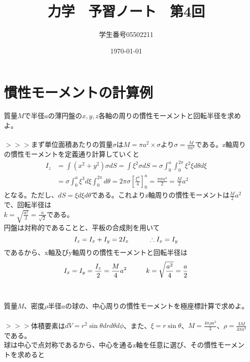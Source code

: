 \documentclass{jsarticle}
\title{力学　予習ノート　第4回}
\author{学生番号05502211}
\date{\today}
\begin{document}
\maketitle
\section{慣性モーメントの計算例}
\noindent
\(<例題1>\)\\
質量\(M\)で半径\(a\)の薄円盤の\(x,y,z\)各軸の周りの慣性モーメントと回転半径を求めよ。\\
\\
\(>>>\)まず単位面積あたりの質量\(\sigma\)は\(M=\pi a^{2}\times\sigma\)より\(\displaystyle\sigma=\frac{M}{\pi a^{2}}\)である。z軸周りの慣性モーメントを定義通り計算していくと
\begin{align*}
I_{z}&=\int(x^{2}+y^{2})\sigma dS=\int\xi^{2}\sigma dS=\sigma\int_{0}^{a}\int_{0}^{2\pi}\xi^{2}\xi d\theta d\xi\\
&=\sigma\int_{0}^{a}\xi^{3}d\xi\int_{0}^{2\pi}d\theta=2\pi\sigma\left[\frac{\xi^{4}}{4}\right]_{0}^{a}=\frac{\pi\sigma a^{4}}{2}=\frac{M}{2}a^{2}
\end{align*}
となる。ただし、\(dS=\xi d\xi d\theta\)である。これよりz軸周りの慣性モーメントは\(\displaystyle\frac{M}{2}a^{2}\)で、回転半径は\\
\(\displaystyle k=\sqrt{\frac{a^{2}}{2}}=\frac{a}{\sqrt{2}}\)である。\\
円盤は対称的であることと、平板の合成則を用いて
\[I_{z}=I_{x}+I_{y}=2I_{x}\hspace{10mm}\therefore I_{x}=I_{y}\]
であるから、x軸及びy軸周りの慣性モーメントと回転半径は
\[I_{x}=I_{y}=\frac{I_{z}}{2}=\frac{M}{4}a^{2}\hspace{10mm}k=\sqrt{\frac{a^{2}}{4}}=\frac{a}{2}\]
\\
\\
\(<例題2>\)\\
質量\(M\)、密度\(\rho\)半径\(a\)の球の、中心周りの慣性モーメントを極座標計算で求めよ。\\
\\
\(>>>\)体積要素は\(dV=r^{2}\sin\theta drd\theta d\phi\)、また、\(\xi=r\sin\theta\)、\(\displaystyle M=\frac{4\pi\rho a^{3}}{3}\)、\(\displaystyle\rho=\frac{3M}{4\pi a^{3}}\)である。\\
球は中心で点対称であるから、中心を通るz軸を任意に選び、その慣性モーメントを求めると
\end{document}
